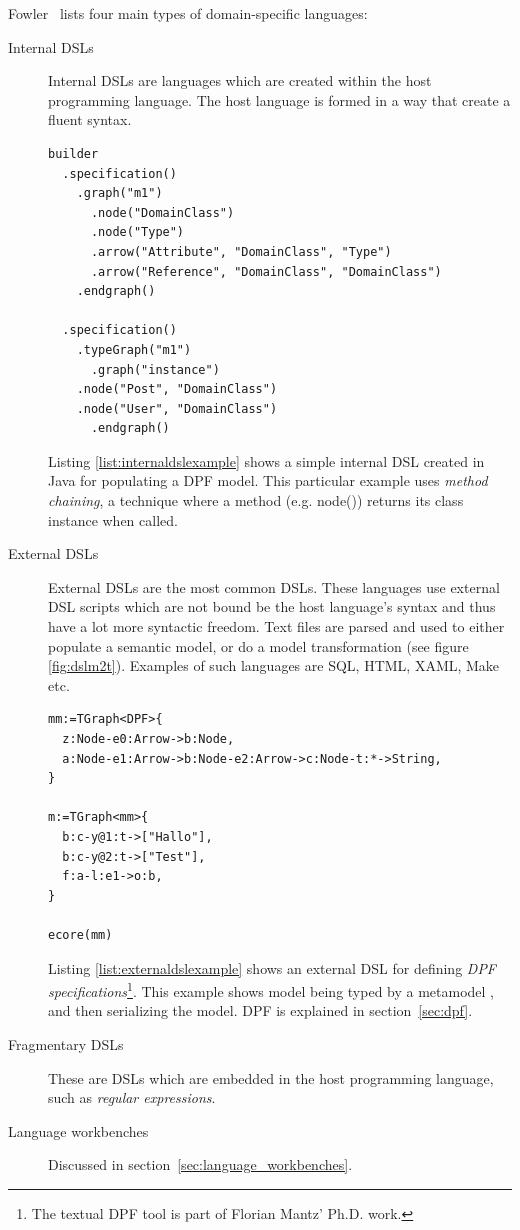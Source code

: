 Fowler~\cite{fowler2010domain} lists four main types of domain-specific languages:
\begin{description}
  \item[Internal DSLs] Internal DSLs are languages which are created within the host programming language. The host language is formed in a way that create a fluent syntax.
  \lstset{language=Java,caption=Simple internal DSL for creating specifications in DPF,label=list:internaldslexample,captionpos=b}
  \begin{lstlisting}[showstringspaces=false]
builder
  .specification()
    .graph("m1")
      .node("DomainClass")
      .node("Type")
      .arrow("Attribute", "DomainClass", "Type")
      .arrow("Reference", "DomainClass", "DomainClass")
    .endgraph()

  .specification()
    .typeGraph("m1")
      .graph("instance")
	.node("Post", "DomainClass")
	.node("User", "DomainClass")
      .endgraph()
  \end{lstlisting}
  Listing \ref{list:internaldslexample} shows a simple internal DSL created in Java for populating a DPF model. This particular example uses \emph{method chaining}, a technique where a method (e.g. node()) returns its class instance when called.
  
  \item[External DSLs] External DSLs are the most common DSLs. These languages use external DSL scripts which are not bound be the host language's syntax and thus have a lot more syntactic freedom. Text files are parsed and used to either populate a semantic model, or do a model transformation (see figure \ref{fig:dslm2t}). Examples of such languages are SQL, HTML, XAML, Make etc.
 \lstset{caption=External DSL for creating specifications in DPF,label=list:externaldslexample,captionpos=b}
    \begin{lstlisting}[showstringspaces=false]
mm:=TGraph<DPF>{
  z:Node-e0:Arrow->b:Node,
  a:Node-e1:Arrow->b:Node-e2:Arrow->c:Node-t:*->String,
}

m:=TGraph<mm>{
  b:c-y@1:t->["Hallo"],
  b:c-y@2:t->["Test"],
  f:a-l:e1->o:b,
}

ecore(mm)
    \end{lstlisting}
  Listing \ref{list:externaldslexample} shows an external DSL for defining \emph{DPF specifications}\footnote{The textual DPF tool is part of Florian Mantz' Ph.D. work.}. This example shows model  being typed by a metamodel , and then serializing the model. DPF is explained in section~\ref{sec:dpf}.
  \item[Fragmentary DSLs] These are DSLs which are embedded in the host programming language, such as \emph{regular expressions}.
  \item[Language workbenches] Discussed in section~\ref{sec:language_workbenches}.
\end{description}

